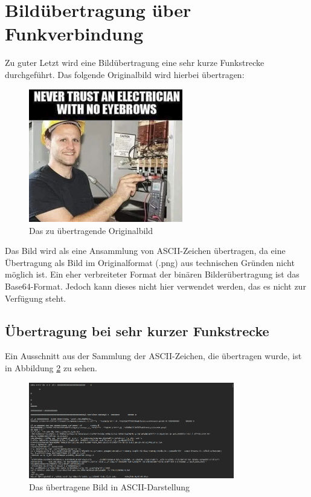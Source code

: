 \section{Bildübertragung über Funkverbindung}
Zu guter Letzt wird eine Bildübertragung eine sehr kurze Funkstrecke durchgeführt. Das folgende Originalbild wird hierbei übertragen:
\begin{figure}[H]
    \centering
    \includegraphics[width=0.6\textwidth]{Pictures/meme.jpg}
    \caption{Das zu übertragende Originalbild}
    \label{fig:Task2b}
\end{figure}

Das Bild wird als eine Ansammlung von ASCII-Zeichen übertragen, da eine Übertragung als Bild im Originalformat (.png) aus technischen Gründen nicht möglich ist.
Ein eher verbreiteter Format der binären Bilderübertragung ist das Base64-Format. Jedoch kann dieses nicht hier verwendet werden, das es nicht zur Verfügung steht.

\subsection{Übertragung bei sehr kurzer Funkstrecke}
Ein Ausschnitt aus der Sammlung der ASCII-Zeichen, die übertragen wurde, ist in Abbildung \ref{fig:Task2c} zu sehen.

\begin{figure}[H]
    \centering
    \includegraphics[width=0.8\textwidth]{Pictures/memeASCII.png}
    \caption{Das übertragene Bild in ASCII-Darstellung}
    \label{fig:Task2c}
\end{figure}

